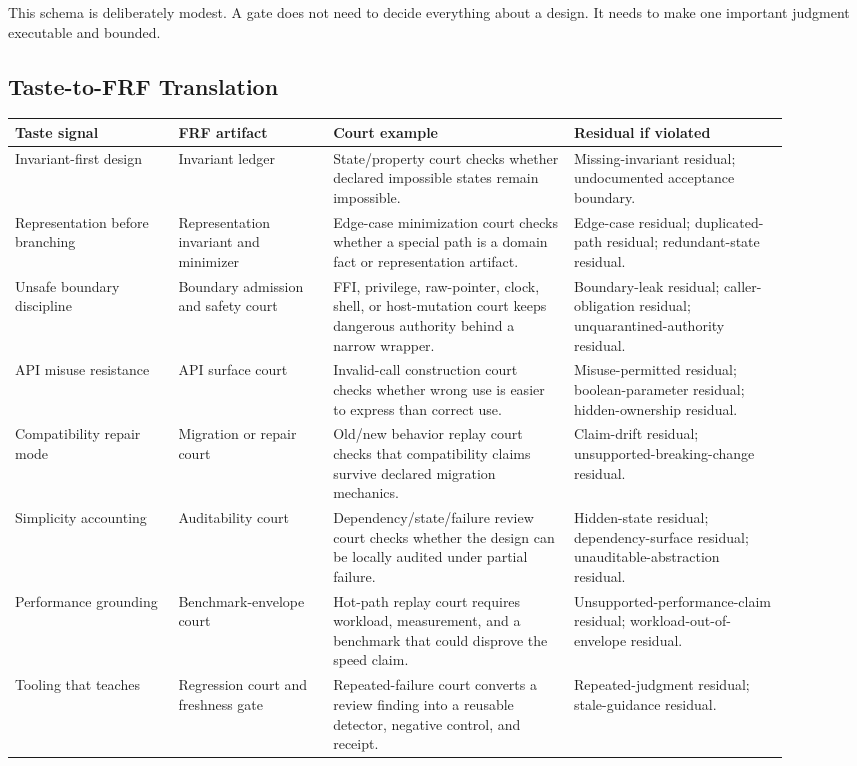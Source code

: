 \documentclass[11pt,a4paper]{article}
\begin{document}
This schema is deliberately modest. A gate does not need to decide everything about a design. It needs to make one important judgment executable and bounded.

\subsection{Taste-to-FRF Translation}

\begingroup
\small
\setlength{\tabcolsep}{3pt}
\begin{longtable}{>{\raggedright\arraybackslash}p{0.19\linewidth}>{\raggedright\arraybackslash}p{0.18\linewidth}>{\raggedright\arraybackslash}p{0.28\linewidth}>{\raggedright\arraybackslash}p{0.25\linewidth}}
\toprule
\textbf{Taste signal} & \textbf{FRF artifact} & \textbf{Court example} & \textbf{Residual if violated} \\
\midrule
\endhead
Invariant-first design & Invariant ledger & State/property court checks whether declared impossible states remain impossible. & Missing-invariant residual; undocumented acceptance boundary. \\
Representation before branching & Representation invariant and minimizer & Edge-case minimization court checks whether a special path is a domain fact or representation artifact. & Edge-case residual; duplicated-path residual; redundant-state residual. \\
Unsafe boundary discipline & Boundary admission and safety court & FFI, privilege, raw-pointer, clock, shell, or host-mutation court keeps dangerous authority behind a narrow wrapper. & Boundary-leak residual; caller-obligation residual; unquarantined-authority residual. \\
API misuse resistance & API surface court & Invalid-call construction court checks whether wrong use is easier to express than correct use. & Misuse-permitted residual; boolean-parameter residual; hidden-ownership residual. \\
Compatibility repair mode & Migration or repair court & Old/new behavior replay court checks that compatibility claims survive declared migration mechanics. & Claim-drift residual; unsupported-breaking-change residual. \\
Simplicity accounting & Auditability court & Dependency/state/failure review court checks whether the design can be locally audited under partial failure. & Hidden-state residual; dependency-surface residual; unauditable-abstraction residual. \\
Performance grounding & Benchmark-envelope court & Hot-path replay court requires workload, measurement, and a benchmark that could disprove the speed claim. & Unsupported-performance-claim residual; workload-out-of-envelope residual. \\
Tooling that teaches & Regression court and freshness gate & Repeated-failure court converts a review finding into a reusable detector, negative control, and receipt. & Repeated-judgment residual; stale-guidance residual. \\
\bottomrule
\end{longtable}
\endgroup
\end{document}
